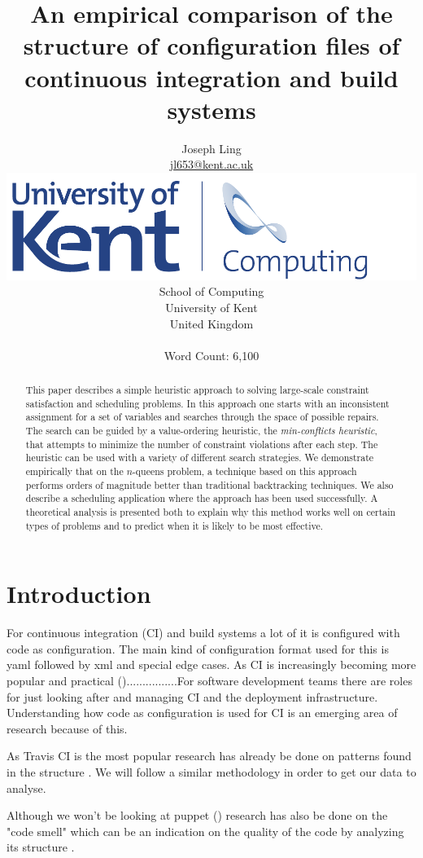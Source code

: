 \documentclass[twoside,12pt,titlepage,a4paper]{article}
\title{An empirical comparison of the structure of configuration files of continuous integration and build systems}
\author{Joseph Ling\\\vspace{10mm}
       \url{jl653@kent.ac.uk} \\ \vspace{5mm}
       \includegraphics[scale=0.6]{Kent_Comp_294_RGB} \\
       School of Computing \\
       University of Kent \\
       United Kingdom \\ \vspace{10mm} \\ Word Count: 6,100}
\begin{document}
\maketitle
\restoregeometry              %

\begin{abstract}
This paper describes a simple heuristic approach to solving large-scale
constraint satisfaction and scheduling problems.  In this approach one
starts with an inconsistent assignment for a set of variables and
searches through the space of possible repairs. The search can be guided
by a value-ordering heuristic, the {\em min-conflicts heuristic}, that
attempts to minimize the number of constraint violations after each
step.  The heuristic can be used with a variety of different search
strategies.  We demonstrate empirically that on the $n$-queens problem, 
a technique
based on this approach performs orders of magnitude better than
traditional backtracking techniques.  We also describe a
scheduling application where the approach has been used successfully.  A
theoretical analysis is presented both to explain why this method works
well on certain types of problems and to predict when it is likely to
be most effective.
\end{abstract}

\section{Introduction}
\label{Introduction}

For continuous integration (CI) and build systems a lot of it is configured with code as configuration. The main kind of configuration format used for this is yaml followed by xml and special edge cases. As CI is increasingly becoming more popular and practical ()................For software development teams there are roles for just looking after and managing CI and the deployment infrastructure. Understanding how code as configuration is used for CI is an emerging area of research because of this. 


As Travis CI is the most popular research has already be done on patterns found in the structure \cite{Gallaba2018}. We will follow a similar methodology in order to get our data to analyse. 

Although we won't be looking at puppet () research has also be done on the "code smell" which can be an indication on the quality of the code by analyzing its structure \cite{Sharma2016}.
\end{document}
